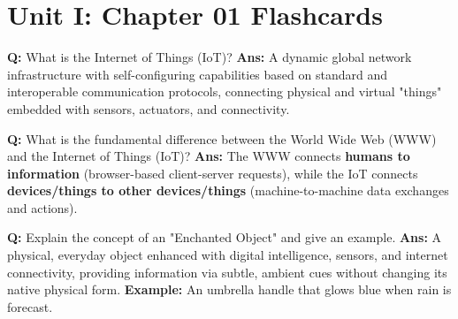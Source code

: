 \documentclass[10pt,a4paper,twocolumn]{article}
\begin{document}

\section*{Unit I: Chapter 01 Flashcards}

\begin{tcolorbox}[
  colback=white,
  colframe=UnitColorOne,
  colbacktitle=gray!10!white,
  coltitle=black,
  fonttitle=\bfseries\sffamily\small,
  title={Unit I $\bullet$ Card 1},
  boxrule=1.2pt,
  arc=2mm,
  outer arc=2mm,
  boxsep=1.5mm,
  top=1mm,
  bottom=1mm,
  left=1.5mm,
  right=1.5mm,
  before skip=2.5mm,
  after skip=2.5mm
]
\textbf{Q:} What is the Internet of Things (IoT)?
\tcbline
\textbf{Ans:} A dynamic global network infrastructure with self-configuring capabilities based on standard and interoperable communication protocols, connecting physical and virtual "things" embedded with sensors, actuators, and connectivity.
\end{tcolorbox}


\begin{tcolorbox}[
  colback=white,
  colframe=UnitColorOne,
  colbacktitle=gray!10!white,
  coltitle=black,
  fonttitle=\bfseries\sffamily\small,
  title={Unit I $\bullet$ Card 2},
  boxrule=1.2pt,
  arc=2mm,
  outer arc=2mm,
  boxsep=1.5mm,
  top=1mm,
  bottom=1mm,
  left=1.5mm,
  right=1.5mm,
  before skip=2.5mm,
  after skip=2.5mm
]
\textbf{Q:} What is the fundamental difference between the World Wide Web (WWW) and the Internet of Things (IoT)?
\tcbline
\textbf{Ans:} The WWW connects \textbf{humans to information} (browser-based client-server requests), while the IoT connects \textbf{devices/things to other devices/things} (machine-to-machine data exchanges and actions).
\end{tcolorbox}


\begin{tcolorbox}[
  colback=white,
  colframe=UnitColorOne,
  colbacktitle=gray!10!white,
  coltitle=black,
  fonttitle=\bfseries\sffamily\small,
  title={Unit I $\bullet$ Card 3},
  boxrule=1.2pt,
  arc=2mm,
  outer arc=2mm,
  boxsep=1.5mm,
  top=1mm,
  bottom=1mm,
  left=1.5mm,
  right=1.5mm,
  before skip=2.5mm,
  after skip=2.5mm
]
\textbf{Q:} Explain the concept of an "Enchanted Object" and give an example.
\tcbline
\textbf{Ans:} A physical, everyday object enhanced with digital intelligence, sensors, and internet connectivity, providing information via subtle, ambient cues without changing its native physical form. \textbf{Example:} An umbrella handle that glows blue when rain is forecast.
\end{tcolorbox}
\end{document}
